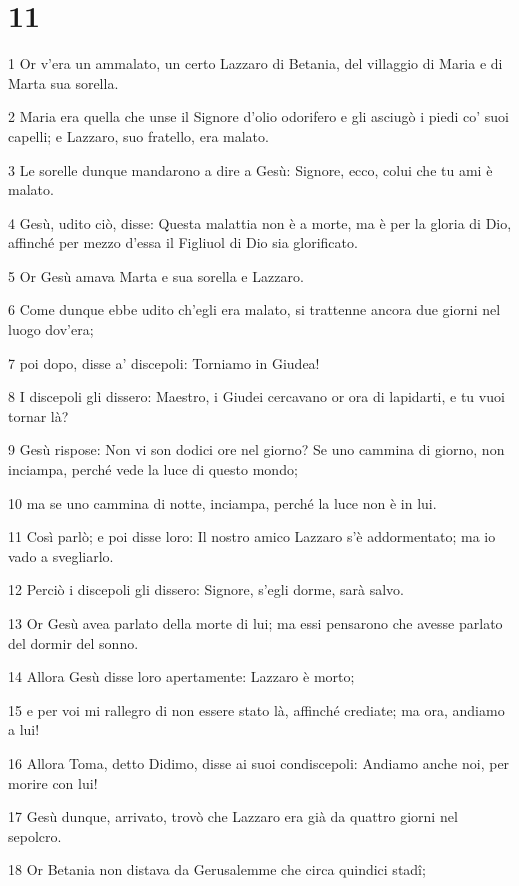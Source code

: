 \chapter{11}

\par 1 Or v'era un ammalato, un certo Lazzaro di Betania, del villaggio di Maria e di Marta sua sorella.
\par 2 Maria era quella che unse il Signore d'olio odorifero e gli asciugò i piedi co' suoi capelli; e Lazzaro, suo fratello, era malato.
\par 3 Le sorelle dunque mandarono a dire a Gesù: Signore, ecco, colui che tu ami è malato.
\par 4 Gesù, udito ciò, disse: Questa malattia non è a morte, ma è per la gloria di Dio, affinché per mezzo d'essa il Figliuol di Dio sia glorificato.
\par 5 Or Gesù amava Marta e sua sorella e Lazzaro.
\par 6 Come dunque ebbe udito ch'egli era malato, si trattenne ancora due giorni nel luogo dov'era;
\par 7 poi dopo, disse a' discepoli: Torniamo in Giudea!
\par 8 I discepoli gli dissero: Maestro, i Giudei cercavano or ora di lapidarti, e tu vuoi tornar là?
\par 9 Gesù rispose: Non vi son dodici ore nel giorno? Se uno cammina di giorno, non inciampa, perché vede la luce di questo mondo;
\par 10 ma se uno cammina di notte, inciampa, perché la luce non è in lui.
\par 11 Così parlò; e poi disse loro: Il nostro amico Lazzaro s'è addormentato; ma io vado a svegliarlo.
\par 12 Perciò i discepoli gli dissero: Signore, s'egli dorme, sarà salvo.
\par 13 Or Gesù avea parlato della morte di lui; ma essi pensarono che avesse parlato del dormir del sonno.
\par 14 Allora Gesù disse loro apertamente: Lazzaro è morto;
\par 15 e per voi mi rallegro di non essere stato là, affinché crediate; ma ora, andiamo a lui!
\par 16 Allora Toma, detto Didimo, disse ai suoi condiscepoli: Andiamo anche noi, per morire con lui!
\par 17 Gesù dunque, arrivato, trovò che Lazzaro era già da quattro giorni nel sepolcro.
\par 18 Or Betania non distava da Gerusalemme che circa quindici stadî;

